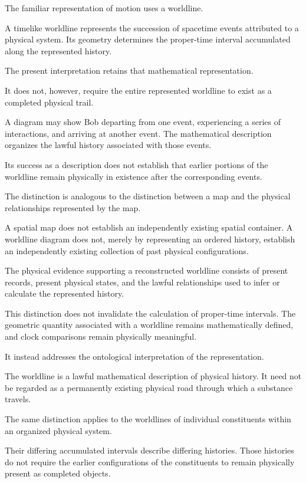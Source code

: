 \documentclass[12pt,onecolumn]{article}
\begin{document}
The familiar representation of motion uses a worldline.

A timelike worldline represents the succession of spacetime events attributed to a physical system. Its geometry determines the proper-time interval accumulated along the represented history.

The present interpretation retains that mathematical representation.

It does not, however, require the entire represented worldline to exist as a completed physical trail.

A diagram may show Bob departing from one event, experiencing a series of interactions, and arriving at another event. The mathematical description organizes the lawful history associated with those events.

Its success as a description does not establish that earlier portions of the worldline remain physically in existence after the corresponding events.

The distinction is analogous to the distinction between a map and the physical relationships represented by the map.

A spatial map does not establish an independently existing spatial container. A worldline diagram does not, merely by representing an ordered history, establish an independently existing collection of past physical configurations.

The physical evidence supporting a reconstructed worldline consists of present records, present physical states, and the lawful relationships used to infer or calculate the represented history.

This distinction does not invalidate the calculation of proper-time intervals. The geometric quantity associated with a worldline remains mathematically defined, and clock comparisons remain physically meaningful.

It instead addresses the ontological interpretation of the representation.

The worldline is a lawful mathematical description of physical history. It need not be regarded as a permanently existing physical road through which a substance travels.

The same distinction applies to the worldlines of individual constituents within an organized physical system.

Their differing accumulated intervals describe differing histories. Those histories do not require the earlier configurations of the constituents to remain physically present as completed objects.
\end{document}

